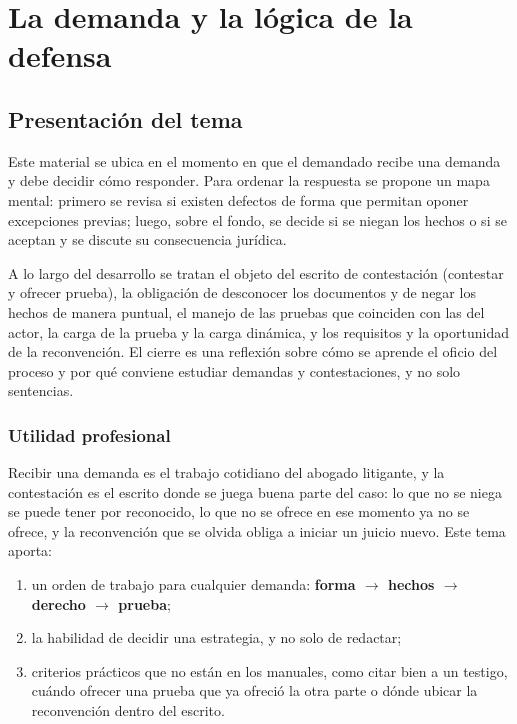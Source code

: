 \documentclass[12pt,oneside]{book}
\begin{document}
\tableofcontents
\clearpage

\chapter[La demanda y la lógica de la defensa]{La demanda y la lógica de la defensa}

\section{Presentación del tema}

Este material se ubica en el momento en que el demandado recibe una demanda y debe decidir cómo responder. Para ordenar la respuesta se propone un mapa mental: primero se revisa si existen defectos de forma que permitan oponer excepciones previas; luego, sobre el fondo, se decide si se niegan los hechos o si se aceptan y se discute su consecuencia jurídica.

A lo largo del desarrollo se tratan el objeto del escrito de contestación (contestar y ofrecer prueba), la obligación de desconocer los documentos y de negar los hechos de manera puntual, el manejo de las pruebas que coinciden con las del actor, la carga de la prueba y la carga dinámica, y los requisitos y la oportunidad de la reconvención. El cierre es una reflexión sobre cómo se aprende el oficio del proceso y por qué conviene estudiar demandas y contestaciones, y no solo sentencias.

\subsection{Utilidad profesional}

Recibir una demanda es el trabajo cotidiano del abogado litigante, y la contestación es el escrito donde se juega buena parte del caso: lo que no se niega se puede tener por reconocido, lo que no se ofrece en ese momento ya no se ofrece, y la reconvención que se olvida obliga a iniciar un juicio nuevo. Este tema aporta:

\begin{enumerate}
    \item un orden de trabajo para cualquier demanda: \textbf{forma $\rightarrow$ hechos $\rightarrow$ derecho $\rightarrow$ prueba};
    \item la habilidad de decidir una estrategia, y no solo de redactar;
    \item criterios prácticos que no están en los manuales, como citar bien a un testigo, cuándo ofrecer una prueba que ya ofreció la otra parte o dónde ubicar la reconvención dentro del escrito.
\end{enumerate}
\end{document}
